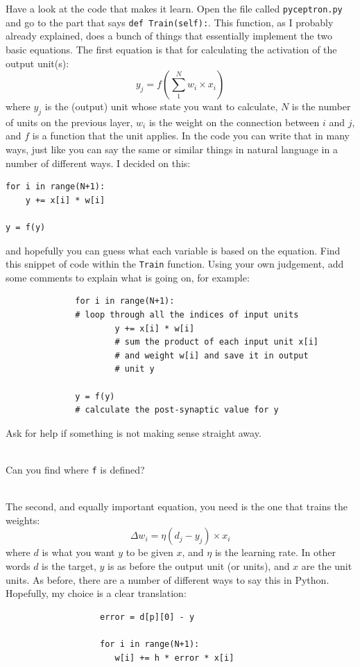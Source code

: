\documentclass[a4paper,10pt]{article}
\begin{document}
Have a look at the code that makes it learn. Open the file called \texttt{pyceptron.py} and go to the part that says \texttt{def Train(self):}. This function, as I probably already explained, does a bunch of things that essentially implement the two basic equations. The first equation is that for calculating the activation of the output unit(s): 
\begin{equation}
y_j = f \left( \sum_1^N w_i \times x_i \right)
\end{equation} 
where $y_j$ is the (output) unit whose state you want to calculate, $N$ is the number of units on the previous layer, $w_{i}$ is the weight on the connection between $i$ and $j$, and $f$ is a function that the unit applies. In the code you can write that in many ways, just like you can say the same or similar things in natural language in a number of different ways. I decided on this:
\begin{lstlisting}
for i in range(N+1): 
	y += x[i] * w[i]
	
y = f(y)
\end{lstlisting}
and hopefully you can guess what each variable is based on the equation. Find this snippet of code within the \texttt{Train} function. Using your own judgement, add some comments to explain what is going on, for example:
\begin{lstlisting}
              for i in range(N+1): 
              # loop through all the indices of input units
                      y += x[i] * w[i]
                      # sum the product of each input unit x[i]
                      # and weight w[i] and save it in output
                      # unit y
                      
              y = f(y)
              # calculate the post-synaptic value for y
\end{lstlisting}
Ask for help if something is not making sense straight away.
\\ \ 

Can you find where \texttt{f} is defined?
\\ \

The second, and equally important equation, you need is the one that trains the weights:
\begin{equation}
\Delta w_i = \eta  ( d_j - y_j ) \times x_{i}
\end{equation} 
where $d$ is what you want $y$ to be given $x$, and $\eta$ is the learning rate. In other words $d$ is the target, $y$ is as before the output unit (or units), and $x$ are the unit units. As before, there are a number of different ways to say this in Python. Hopefully, my choice is a clear translation:
\begin{lstlisting}
                   error = d[p][0] - y
                   
                   for i in range(N+1): 
                      w[i] += h * error * x[i]\end{lstlisting} 
\end{document}

